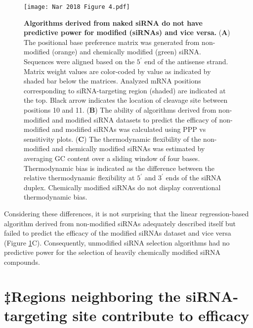 \documentclass{report}
\begin{document}
\begin{figure}
    \centering
    \texttt{[image: Nar 2018 Figure 4.pdf]}
    \caption{\textbf{Algorithms derived from naked siRNA do not have predictive power for modified (siRNAs) and vice versa.} (\textbf{A}) The positional base preference matrix was generated from non-modified (orange) \cite{huesken_design_2005} and chemically modified (green) siRNA. Sequences were aligned based on the $5^\prime$ end of the antisense strand. Matrix weight values are color-coded by value as indicated by shaded bar below the matrices. Analyzed mRNA positions corresponding to siRNA-targeting region (shaded) are indicated at the top. Black arrow indicates the location of cleavage site between positions 10 and 11. (\textbf{B}) The ability of algorithms derived from non-modified and modified siRNA datasets to predict the efficacy of non-modified and modified siRNAs was calculated using PPP vs sensitivity plots. (\textbf{C}) The thermodynamic flexibility of the non-modified and chemically modified siRNAs was estimated by averaging GC content over a sliding window of four bases. Thermodynamic bias is indicated as the difference between the relative thermodynamic flexibility at $5^\prime$ and $3^\prime$ ends of the siRNA duplex. Chemically modified siRNAs do not display conventional thermodynamic bias.}
    \label{fig:Figure‡ 4}
\end{figure}

Considering these differences, it is not surprising that the linear regression-based algorithm derived from non-modified siRNAs adequately described itself but failed to predict the efficacy of the modified siRNAs dataset and vice versa (Figure \ref{fig:Figure‡ 4}C). Consequently, unmodified siRNA selection algorithms had no predictive power for the selection of heavily chemically modified siRNA compounds.

\section{‡Regions neighboring the siRNA-targeting site contribute to efficacy}
\end{document}

